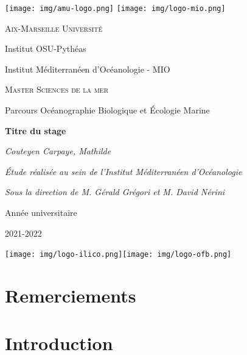 \documentclass[12pt]{article}
\renewcommand{\thepage}{}
\newcommand\myemptypage{
    \null
    \thispagestyle{empty}
    \newpage
    }
\begin{document}
\begin{titlepage}
\centering
\texttt{[image: img/amu-logo.png]} \hfill \texttt{[image: img/logo-mio.png]}\par\vspace{1cm}
{\scshape\large Aix-Marseille Université\par}
{\large Institut OSU-Pythéas\par}
Institut Méditerranéen d’Océanologie - MIO \par
\vspace{2cm}
{\scshape\large Master Sciences de la mer\par}
{\large Parcours Océanographie Biologique et Écologie Marine\par}
\vspace{2cm}
{\LARGE \bfseries Titre du stage\par}
\vspace{.5cm}
{\large \itshape Couteyen Carpaye, Mathilde\par}
\vfill
{\itshape Étude réalisée au sein de l'Institut Méditerranéen d'Océanologie\par}
{\itshape Sous la direction de M. Gérald Grégori et M. David Nérini\par }
\vfill
Année universitaire\par
2021-2022\par 
\texttt{[image: img/logo-ilico.png]}\hfill  \texttt{[image: img/logo-ofb.png]} 
\end{titlepage}

\myemptypage

\section*{Remerciements}


\newpage


\newpage
\tableofcontents
\newpage

\renewcommand{\thepage}{\arabic{page}}
\setcounter{page}{1}

\section{Introduction}

\end{document}
